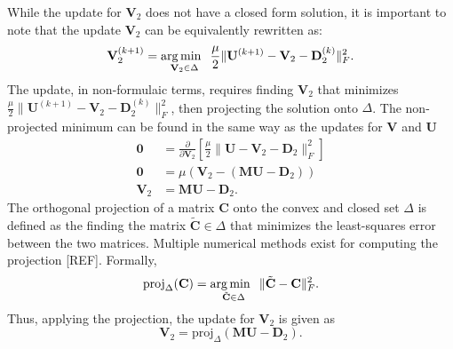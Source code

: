 While the update for $\mathbf{V}_2$ does not have a closed form solution, it is important to note that the update $\mathbf{V}_2$ can be equivalently rewritten as:
$$
\mathbf{V}_2^{(k+1)} = \operatorname*{arg\,min \;\;}_{\mathbf{V}_2 \in \Delta} \frac{\mu}{2} \|\mathbf{U}^{(k+1)} - \mathbf{V}_2 - \mathbf{D}_2^{(k)}\|_F^2.
$$
The update, in non-formulaic terms, requires finding $\mathbf{V}_2$ that minimizes $\frac{\mu}{2} \|\mathbf{U}^{(k+1)} - \mathbf{V}_2 - \mathbf{D}_2^{(k)}\|_F^2$, then projecting the solution onto $\Delta$. 
The non-projected minimum can be found in the same way as the updates for $\mathbf{V}$ and $\mathbf{U}$
\begin{equation*}
  \begin{aligned}
    \mathbf{0} &= \frac{\partial}{\partial \mathbf{V}_2} \left[\frac{\mu}{2} \|\mathbf{U} - \mathbf{V}_2 - \mathbf{D}_2\|_F^2\right]
    \\
    \mathbf{0} &= \mu(\mathbf{V}_2 - (\mathbf{MU} - \mathbf{D}_2))
    \\
    \mathbf{V}_2 &= \mathbf{MU} - \mathbf{D}_2.
  \end{aligned}
\end{equation*}
The orthogonal projection of a matrix $\mathbf{C}$ onto the convex and closed set $\Delta$ is defined as the finding the matrix $\tilde{\mathbf{C}} \in \Delta$ that minimizes the least-squares error between the two matrices. Multiple numerical methods exist for computing the projection [REF]. Formally,
\begin{equation*}
  \text{proj}_\Delta(\mathbf{C}) = \operatorname*{arg\,min \;\;}_{\tilde{\mathbf{C}} \in \Delta} \|\tilde{\mathbf{C}} - \mathbf{C}\|_F^2.
\end{equation*}
Thus, applying the projection, the update for $\mathbf{V}_2$ is given as
\begin{equation*}
  \mathbf{V}_2 = \text{proj}_\Delta(\mathbf{MU} - \mathbf{D}_2).
\end{equation*}

